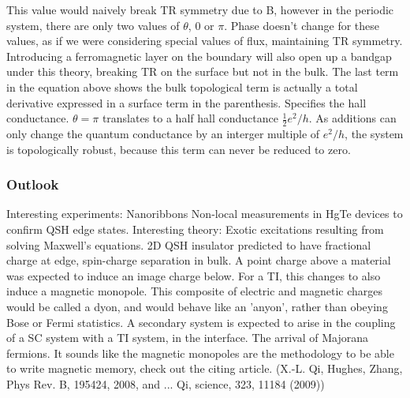 \documentclass[../mattg_ti-fii_lit-review.tex]{subfiles}
\begin{document}
\begin{outline}
		\3 This value would naively break TR symmetry due to B, however in the periodic system, there are only two values of $\theta$, 0 or $\pi$. Phase doesn't change for these values, as if we were considering special values of flux, maintaining TR symmetry. 
		\3 Introducing a ferromagnetic layer on the boundary will also open up a bandgap under this theory, breaking TR on the surface but not in the bulk.
		\3 The last term in the equation above shows the bulk topological term is actually a total derivative expressed in a surface term in the parenthesis.
		\4 Specifies the hall conductance. $\theta=\pi$ translates to a half hall conductance $\frac{1}{2}e^2/h$. 
		\4 As additions can only change the quantum conductance by an interger multiple of $e^2/h$, the system is topologically robust, because this term can never be reduced to zero.		
	\end{outline}
	
	\subsubsection{Outlook}
	\begin{outline}
		\1 Interesting experiments:
		\2 Nanoribbons
		\2 Non-local measurements in HgTe devices to confirm QSH edge states.
		\1 Interesting theory:
		\2 Exotic excitations resulting from solving Maxwell's equations.
		\2 2D QSH insulator predicted to have fractional charge at edge, spin-charge separation in bulk.
		\2 A point charge above a material was expected to induce an image charge below. For a TI, this changes to also induce a magnetic monopole. This composite of electric and magnetic charges would be called a dyon, and would behave like an 'anyon', rather than obeying Bose or Fermi statistics.
		\2 A secondary system is expected to arise in the coupling of a SC system with a TI system, in the interface. The arrival of Majorana fermions.
		\2 It sounds like the magnetic monopoles are the methodology to be able to write magnetic memory, check out the citing article. (X.-L. Qi, Hughes, Zhang, Phys Rev. B, 195424, 2008, and ... Qi, science, 323, 11184 (2009))
		
	\end{outline}
	
\end{document}
